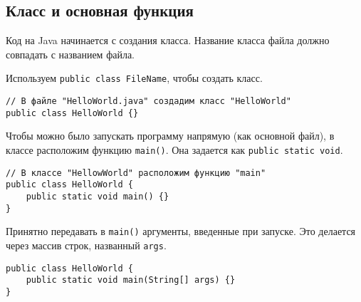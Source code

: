 \subsection{Класс и основная функция}
Код на Java начинается с создания класса.\newline
Название класса файла должно совпадать с названием файла. \par
Используем \texttt{public class FileName}, чтобы создать класс.
\begin{verbatim}
// В файле "HelloWorld.java" создадим класс "HelloWorld"
public class HelloWorld {}
\end{verbatim}
\vspace{0.3cm}

Чтобы можно было запускать программу напрямую (как основной файл), в классе расположим функцию \texttt{main()}. Она задается как \texttt{public static void}.
\begin{verbatim}
// В классе "HellowWorld" расположим функцию "main"
public class HelloWorld {
    public static void main() {}
}
\end{verbatim}
\vspace{0.3cm}

Принятно передавать в \texttt{main()} аргументы, введенные при запуске. Это делается через массив строк, названный \texttt{args}.
\begin{verbatim}
public class HelloWorld {
    public static void main(String[] args) {}
}
\end{verbatim}
\vspace{0.3cm}

